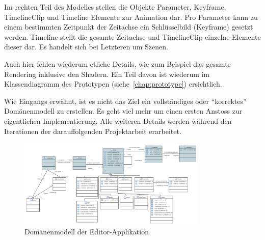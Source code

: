 Im rechten Teil des Modelles stellen die Objekte Parameter, Keyframe,
TimelineClip und Timeline Elemente zur Animation dar. Pro Parameter kann zu
einem bestimmten Zeitpunkt der Zeitachse ein Schlüsselbild (Keyframe) gesetzt
werden. Timeline stellt die gesamte Zeitachse und TimelineClip einzelne
Elemente dieser dar. Es handelt sich bei Letzteren um Szenen.

Auch hier fehlen wiederum etliche Details, wie zum Beispiel das gesamte
Rendering inklusive den Shadern. Ein Teil davon ist wiederum im Klassendiagramm
des Prototypen (siehe~\autoref{chap:prototype}) ersichtlich.

Wie Eingangs erwähnt, ist es nicht das Ziel ein vollständiges oder
``korrektes'' Domänenmodell zu erstellen. Es geht viel mehr um einen ersten
Anstoss zur eigentlichen Implementierung. Alle weiteren Details werden während
den Iterationen der darauffolgenden Projektarbeit erarbeitet.

\begin{figure}[H]
    \centering
    \includegraphics[angle=90,width=0.8\textwidth]{img/editor_domain_model.pdf}
    \caption{Domänenmodell der
        Editor-Applikation}\label{fig:domain-model:editor}
\end{figure}
